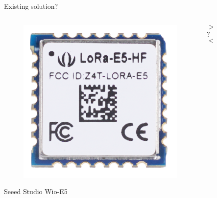 \documentclass[hyphens]{beamer}
\begin{document}
\begin{frame}{Existing solution?}
\begin{columns}
\begin{column}{.4\textwidth}
    \centering
    \begin{figure}
        \includegraphics[width=\linewidth]{img/wio-e5.png}
    \end{figure}
    Seeed Studio Wio-E5
\end{column}
\hfil
\begin{column}{.1\textwidth}
    \centering
    \Large
    \vspace{-2em}
    $$>$$
    ?
    $$<$$
\end{column}
\hfil
\begin{column}{.4\textwidth}
    \centering
    \begin{figure}

\end{figure}
\end{column}
\end{columns}
\end{frame}
\end{document}
